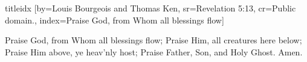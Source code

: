 \documentclass{article}
\begin{document}

\begin{songs}{titleidx}
[by={Louis Bourgeois and Thomas Ken},
	sr={Revelation 5:13},
	cr={Public domain.},
	index={Praise God, from Whom all blessings flow}]
	\beginverse


	Praise God, from Whom all blessings flow;
	Praise Him, all creatures here below;
	Praise Him above, ye heav'nly host;
	Praise Father, Son, and Holy Ghost.
	Amen.

	\endverse
	\endsong
	\end{songs}

	
\end{document}
